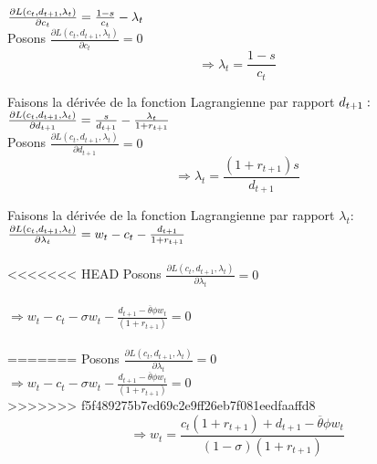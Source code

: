 \documentclass[11pt,twoside,a4paper]{article}
\begin{document}
$\\
\frac{\partial L(c_t,d_{t+1},\lambda_t)}{\partial c_t} = \frac{1-s}{c_t} - \lambda_t 
$ \\
Posons  $ \frac{\partial L(c_t,d_{t+1},\lambda_t)}{\partial c_t} = 0  $ \\



\begin{equation}\label{eq:test4}
  \Rightarrow \lambda_t=\frac{1-s}{c_t}
\end{equation} 


Faisons la dérivée de la fonction Lagrangienne par rapport $d_{t+1} : \\ $
$\\
\frac{\partial L(c_t,d_{t+1},\lambda_t)}{\partial d_{t+1}} = \frac{s}{ d_{t+1}} - \frac{\lambda_t}{1+r_{t+1}} 
$\\

Posons  $ \frac{\partial L(c_t,d_{t+1},\lambda_t)}{\partial d_{t+1}} = 0 $ \\



  \begin{equation}\label{eq:test5}
  \Rightarrow \lambda_t=\frac{(1+r_{t+1})s}{ d_{t+1}}
\end{equation}  

Faisons la dérivée de la fonction Lagrangienne par rapport $\lambda_t :  $ \\
$\\
\frac{\partial L(c_t,d_{t+1},\lambda_t)}{\partial \lambda_t} = w_t-c_t - \frac{d_{t+1}}{1+r_{t+1}} 
$ \\ \\
<<<<<<< HEAD
Posons  $ \frac{\partial L(c_t,d_{t+1},\lambda_t)}{\partial \lambda_t} = 0 $ \\ \\
$\Rightarrow w_t-c_t - \sigma w_t-\frac{d_{t+1}-\overline{\theta}\phi w_t}{(1+r_{t+1})}=0$\\ \\
=======
Posons  $ \frac{\partial L(c_t,d_{t+1},\lambda_t)}{\partial \lambda_t} = 0 $ \\

$\Rightarrow w_t-c_t - \sigma w_t-\frac{d_{t+1}-\overline{\theta}\phi w_t}{(1+r_{t+1})}=0$\\

>>>>>>> f5f489275b7ed69c2e9ff26eb7f081eedfaaffd8
 \begin{equation}\label{eq:test6}
  \Rightarrow w_t = \frac{c_t(1+r_{t+1}) + d_{t+1}-\overline{\theta}\phi w_t}{(1-\sigma)(1+r_{t+1})}
\end{equation}
    
\end{document}
